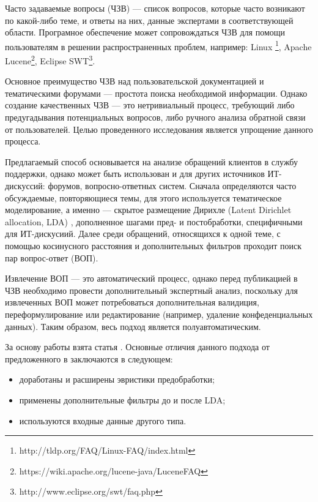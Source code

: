 \intro

Часто задаваемые вопросы (ЧЗВ) --- список вопросов, которые часто возникают по какой-либо теме, и ответы на них, данные экспертами в соответствующей области. Програмное обеспечение может сопровождаться ЧЗВ для помощи пользователям в решении распространенных проблем, например: Linux \footnote{http://tldp.org/FAQ/Linux-FAQ/index.html}, Apache Lucene\footnote{https://wiki.apache.org/lucene-java/LuceneFAQ}, Eclipse SWT\footnote{http://www.eclipse.org/swt/faq.php}.

Основное преимущество ЧЗВ над пользовательской документацией и тематическими форумами --- простота поиска необходимой информации. Однако создание качественных ЧЗВ --- это нетривиальный процесс, требующий либо предугадывания потенциальных вопросов, либо ручного анализа обратной связи от пользователей. Целью проведенного исследования является упрощение данного процесса.

Предлагаемый способ основывается на анализе обращений клиентов в службу поддержки, однако может быть использован и для других источников ИТ-дискуссий: форумов, вопросно-ответных систем. Сначала определяются часто обсуждаемые, повторяющиеся темы, для этого используется тематическое моделирование, а именно --- скрытое размещение Дирихле (Latent Dirichlet allocation, LDA) \cite{LDA}, дополненное шагами пред- и постобработки, специфичными для ИТ-дискусиий. Далее среди обращений, относящихся к одной теме, с помощью косинусного расстояния и дополнительных фильтров проходит поиск пар вопрос-ответ (ВОП).

Извлечение ВОП --- это автоматический процесс, однако перед публикацией в ЧЗВ необходимо провести дополнительный экспертный анализ, поскольку для извлеченных ВОП может потребоваться дополнительная валидиция, переформулирование или редактирование (например, удаление конфеденциальных данных). Таким образом, весь подход является полуавтоматическим.

За основу работы взята статья \cite{original}. Основные отличия данного подхода от предложенного в \cite{original} заключаются в следующем:

\begin{itemize}
\item доработаны и расширены эвристики предобработки;
\item применены дополнительные фильтры до и после LDA;
\item используются входные данные другого типа.
\end{itemize}

